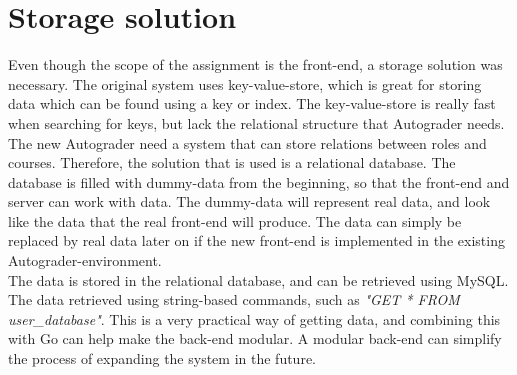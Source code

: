 \section{Storage solution}
Even though the scope of the assignment is the front-end, a storage solution was necessary. The original system uses key-value-store, which is great for storing data which can be found using a key or index. The key-value-store is really fast when searching for keys, but lack the relational structure that Autograder needs. The new Autograder need a system that can store relations between roles and courses. Therefore, the solution that is used is a relational database. The database is filled with dummy-data from the beginning, so that the front-end and server can work with data. The dummy-data will represent real data, and look like the data that the real front-end will produce. The data can simply be replaced by real data later on if the new front-end is implemented in the existing Autograder-environment. \\The data is stored in the relational database, and can be retrieved using MySQL. The data retrieved using string-based commands, such as \emph{"GET * FROM user\_database"}. This is a very practical way of getting data, and combining this with Go can help make the back-end modular. A modular back-end can simplify the process of expanding the system in the future.